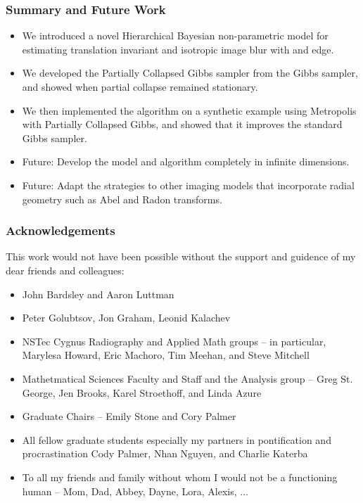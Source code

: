 \documentclass[]{beamer}
\begin{document}
\begin{frame}[t]
  \frametitle{Summary and Future Work}
  {\small
  \begin{itemize}
  \itemsep 1.2em
    \item We introduced a novel \alert{Hierarchical Bayesian non-parametric model} for estimating \alert{translation invariant} and \alert{isotropic} image blur with and edge.
    \item We developed the \alert{Partially Collapsed Gibbs sampler} from the Gibbs sampler, and showed when partial collapse remained \alert{stationary}.
    \item We then implemented the algorithm on a synthetic example using \alert{Metropolis with Partially Collapsed Gibbs}, and showed that it improves the standard Gibbs sampler.
    \item \alert{Future:} Develop the model and algorithm completely in infinite dimensions.
    \item \alert{Future:} Adapt the strategies to other imaging models that incorporate \alert{radial geometry} such as Abel and Radon transforms.
  \end{itemize}
  }
\end{frame}

\begin{frame}
  \frametitle{Acknowledgements}
  This work would not have been possible without the support and guidence of my dear friends and colleagues:
  {\small
  \begin{itemize} 
    \item John Bardsley and Aaron Luttman
    \item Peter Golubtsov, Jon Graham, Leonid Kalachev
    \item NSTec Cygnus Radiography and Applied Math groups -- in particular, Marylesa Howard, Eric Machoro, Tim Meehan, and Steve Mitchell
    \item Mathetmatical Sciences Faculty and Staff and the Analysis group -- Greg St. George, Jen Brooks, Karel Stroethoff, and Linda Azure
    \item Graduate Chairs -- Emily Stone and Cory Palmer
    \item All fellow graduate students especially my partners in pontification and procrastination Cody Palmer, Nhan Nguyen, and Charlie Katerba 
    \item To all my friends and family without whom I would not be a functioning human -- Mom, Dad, Abbey, Dayne, Lora, Alexis, ...
  \end{itemize}
  }
\end{frame}
\end{document}
